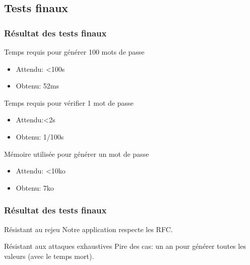 \documentclass[xcolor=table]{beamer}
\begin{document}
\subsection{Tests finaux}
\begin{frame}
\frametitle{Résultat des tests finaux}
\begin{block}{Temps requis pour générer 100 mots de passe}
\begin{itemize}
\item Attendu: \textless  100s
\item Obtenu: 52ms
\end{itemize}
\end{block}
\begin{block}{Temps requis pour vérifier 1 mot de passe}
\begin{itemize}
\item Attendu:\textless  2s
\item Obtenu: 1/100s
\end{itemize}
\end{block}
\begin{block}{Mémoire utilisée pour générer un mot de passe}
\begin{itemize}
\item Attendu: \textless  10ko
\item Obtenu: 7ko
\end{itemize}
\end{block}

\end{frame}

\begin{frame}
\frametitle{Résultat des tests finaux}
\begin{block}{Résistant au rejeu}
Notre application respecte les RFC.
\end{block}
\begin{block}{Résistant aux attaques exhaustives}
Pire des cas: un an pour générer toutes les valeurs (avec le temps mort).
\end{block}


\end{frame}
\end{document}
